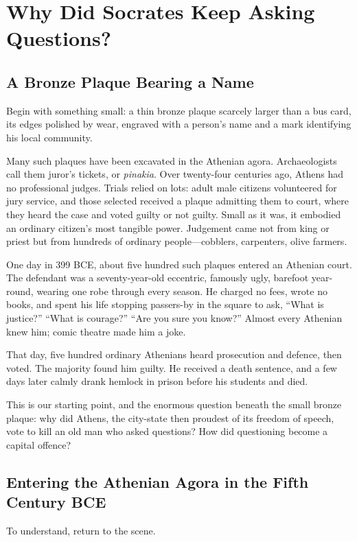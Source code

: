 \chapter[Why Socrates Kept Asking]{Why Did Socrates Keep Asking Questions?}
\section{A Bronze Plaque Bearing a Name}
Begin with something small: a thin bronze plaque scarcely larger than a bus card, its edges polished by wear, engraved with a person's name and a mark identifying his local community.

Many such plaques have been excavated in the Athenian agora. Archaeologists call them juror's tickets, or \textit{pinakia}. Over twenty-four centuries ago, Athens had no professional judges. Trials relied on lots: adult male citizens volunteered for jury service, and those selected received a plaque admitting them to court, where they heard the case and voted guilty or not guilty. Small as it was, it embodied an ordinary citizen's most tangible power. Judgement came not from king or priest but from hundreds of ordinary people---cobblers, carpenters, olive farmers.

One day in 399 BCE, about five hundred such plaques entered an Athenian court. The defendant was a seventy-year-old eccentric, famously ugly, barefoot year-round, wearing one robe through every season. He charged no fees, wrote no books, and spent his life stopping passers-by in the square to ask, ``What is justice?'' ``What is courage?'' ``Are you sure you know?'' Almost every Athenian knew him; comic theatre made him a joke.

That day, five hundred ordinary Athenians heard prosecution and defence, then voted. The majority found him guilty. He received a death sentence, and a few days later calmly drank hemlock in prison before his students and died.

This is our starting point, and the enormous question beneath the small bronze plaque: why did Athens, the city-state then proudest of its freedom of speech, vote to kill an old man who asked questions? How did questioning become a capital offence?

\section[Into the Fifth-Century Athenian Agora]{Entering the Athenian Agora in the Fifth Century BCE}
To understand, return to the scene.

